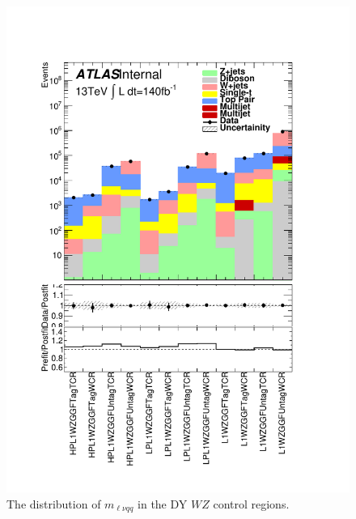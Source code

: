 \begin{figure}[h!]
  \centering
  \includegraphics[width=\hsize]{figures/results/HVTWZ/PlotyieldTable_postfit.pdf}
 \caption{The distribution of $m_{\ell\nu qq}$ in the DY $WZ$ control regions.} 
  \label{fig:hvtwz_cr_postfit}
\end{figure} 
\FloatBarrier

